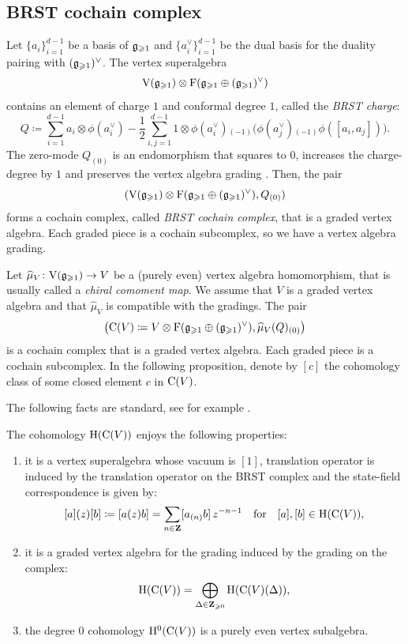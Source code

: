 \subsection{BRST cochain complex}

Let $\{a_i\}_{i=1}^{d-1}$ be a basis of $\mathfrak g_{\geqslant 1}$ and $\{a_i^\vee\}_{i=1}^{d-1}$ be the dual basis for the duality pairing with $(\mathfrak g_{\geqslant 1})^\vee$. The vertex superalgebra
\[ \mathrm V(\mathfrak g_{\geqslant 1}) \otimes \mathrm F(\mathfrak g_{\geqslant 1} \oplus (\mathfrak g_{\geqslant 1})^\vee) \]
contains an element of charge $1$ and conformal degree $1$, called the \emph{BRST charge}:
\[ Q \coloneqq \sum_{i=1}^{d-1} a_i \otimes \phi(a_i^\vee) - \frac{1}{2} \sum_{i, j=1}^{d - 1} 1 \otimes \phi(a_i^\vee){}_{(-1)}\big(\phi(a_j^\vee){}_{(-1)}\phi([a_i, a_j])\big). \]
The zero-mode $Q_{(0)}$ is an endomorphism that squares to $0$, increases the charge-degree by $1$ and preserves the vertex algebra grading \cite[Sections 2.1 and 2.2]{kac2003quantum}. Then, the pair
\[ (\mathrm V(\mathfrak g_{\geqslant 1}) \otimes \mathrm F(\mathfrak g_{\geqslant 1} \oplus (\mathfrak g_{\geqslant 1})^\vee), Q_{(0)}) \]
forms a cochain complex, called \emph{BRST cochain complex}, that is a graded vertex algebra. Each graded piece is a cochain subcomplex, so we have a vertex algebra grading.

Let $\widehat{\mu}_V \colon \mathrm V(\mathfrak g_{\geqslant 1}) \rightarrow V$ be a (purely even) vertex algebra homomorphism, that is usually called a \emph{chiral comoment map}. We assume that $V$ is a graded vertex algebra and that $\widehat{\mu}_V$ is compatible with the gradings. The pair
\[ \big(\mathrm{C}(V) \coloneqq V \otimes \mathrm F(\mathfrak g_{\geqslant 1} \oplus (\mathfrak g_{\geqslant 1})^\vee), \widehat{\mu}_V(Q)_{(0)}\big) \]
is a cochain complex that is a graded vertex algebra. Each graded piece is a cochain subcomplex. In the following proposition, denote by $[c]$ the cohomology class of some closed element $c$ in $\mathrm{C}(V)$.

The following facts are standard, see for example \cite[Section 3.15]{arakawa2007representation}.

\begin{proposition} \label{proposition:brst-cohomology}
	The cohomology $\mathrm{H}(\mathrm{C}(V))$ enjoys the following properties:
	\begin{enumerate}
		\item it is a vertex superalgebra whose vacuum is $[1]$, translation operator is induced by the translation operator on the BRST complex and the state-field correspondence is given by:
		\[ [a](z)[b] \coloneqq [a(z)b] = \sum_{n \in \mathbf{Z}} [a_{(n)}b] \, z^{- n - 1} \quad \text{for} \quad [a], [b] \in \mathrm{H}(\mathrm{C}(V)),  \]
		
		\item it is a graded vertex algebra for the grading induced by the grading on the complex:
		\[ \mathrm{H}(\mathrm{C}(V)) = \bigoplus_{\Delta \in \mathbf{Z}_{\geqslant 0}}  \mathrm{H}(\mathrm{C}(V)(\Delta)), \]
		
		\item the degree $0$ cohomology $\mathrm{H}^0(\mathrm{C}(V))$ is a purely even vertex subalgebra.
	\end{enumerate}
\end{proposition}

